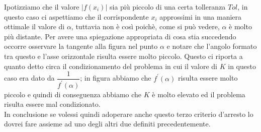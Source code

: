 \documentclass[12pt, a4paper]{book}
\theoremstyle{definition}
\begin{document}
\begin{flushleft}
\begin{figure}[ht!]
\end{figure}

Ipotizziamo che  il valore $|f(x_{i})|$ sia più piccolo di una certa tolleranza $Tol$, in questo caso ci aspettiamo che il corrispondente $x_{i}$ approssimi in una maniera ottimale il valore di $\alpha$, tuttavia non è così poichè, come si può vedere, $\alpha$ è molto più distante.
Per avere una spiegazione appropriata di cosa stia succedendo occorre osservare la tangente alla figura nel punto $\alpha$ e notare che l'angolo formato tra questo e l'asse orizzontale risulta essere molto piccolo.  Questo ci riporta a quanto detto circa il condizionamento del problema in cui il valore di $K$ in questo caso era dato da $\dfrac{1}{f^{'}(\alpha)}$; in figura abbiamo che $f^{'}(\alpha)$ risulta essere molto piccolo e quindi di conseguenza abbiamo che $K$ è molto elevato ed il problema risulta essere mal condizionato.\\

In conclusione se volessi quindi adoperare anche questo terzo criterio d'arresto lo dovrei fare assieme ad uno degli  altri due definiti precedentemente.
\end{flushleft}
\end{document}

